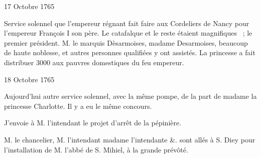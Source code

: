                      \begin{diary}{17 Octobre 1765}{}
                        
                         Service solennel que l'empereur régnant fait
                           faire aux Cordeliers de
                              Nancy pour l'empereur François I son
                           père. Le catafalque et le
                           reste
                           étaient magnifiques  ; le premier président. M. le marquis
                              Dèsarmoises, madame
                              Desarmoises, beaucoup
                           de haute noblesse, et autres personnes qualifiées
                           y ont assistés. La princesse a fait distribuer 3000
                           aux pauvres domestiques du feu empereur. \bigskip
        
        
                     \end{diary}

                     \begin{diary}{18 Octobre 1765}{}
                        
                         Aujourd'hui autre service solennel,
                           avec la
                           même pompe, de la part
                           de madame la princesse
                              Charlotte. Il y a eu le même concours. \bigskip
        
        
                         J'envoie à M. l'intendant le
                           projet d'arrêt
                           de la pépinière. \bigskip
        
        
                        
                           M. le chancelier, M. l'intendant
                           madame l'intendante
                           &. sont allés à S. Diey pour l'installation
                           de M. l'abbé de S.
                              Mihiel, à la grande prévôté. \bigskip
        
        
                     \end{diary}

